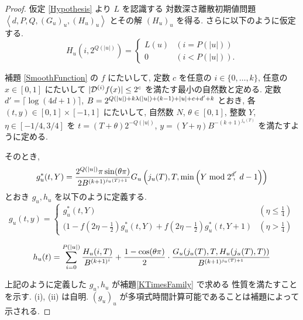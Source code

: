   \begin{proof}
  仮定 \ref{Hypothesis} より $L$ を認識する 
  対数深さ離散初期値問題 $\left< d, P, Q,(G_u)_u,(H_u)_u \right>$
  とその解 $(H_u)_u$ を得る.
  さらに以下のように仮定する.
  \begin{equation}
   H_u(i, 2^{Q(|u|)}) = \begin{cases}
			L(u) & (i=P(|u|)) \\
			0 & (i<P(|u|)).
			\end{cases}
  \end{equation}

    補題 \ref{SmoothFunction} の $f$ にたいして, 
 定数 $c$ を任意の $i \in \{0, \dots, k\}$, 任意の $x \in [0,1]$ にたいして $|\mathcal D^{(i)} f(x)| \le 2^c$ を満たす最小の自然数と定める.
 定数 $d' = \lceil \log (4d + 1) \rceil$, 
 $B = 2^{{Q(|u|)} + k {\lambda(|u|)} + (k - 1) + |u| + c + d' + k}$ とおき, 
 各 $(t, y) \in [0,1] \times [-1, 1]$ にたいして,
 自然数 $N$, $\theta \in [0,1]$, 整数 $Y$, $\eta \in [-1/4, 3/4]$ を
 $t = (T + \theta)2^{-Q(|u|)}$, $y = (Y + \eta)B^{-(k+1)^{j_u(T)}}$ 
  を満たすように定める.
 
 そのとき,
 \begin{equation}
  g^*_u(t, Y) = \frac{2^{Q(|u|)} \pi \sin (\theta\pi)}{2 B^{(k+1)^{j_u(T)+1}}}
   G_u\left( j_u(T), T, \min \left(Y \bmod 2^{d'}\!\!\!,\ d-1 \right) \right)
 \end{equation}
 とおき $g_u, h_u$ を以下のように定義する.
 \begin{equation}
  g_u(t,y) 
  = \begin{cases}
     g^*_u(t, Y)& (\eta \le \frac 1 4) \\
     ( 1-f \left( 2\eta - \frac 1 2 \right)g^*_u(t, Y) 
     + f \left( 2\eta -  \frac 1 2 \right) g^*_u(t, Y+1)
     & (\eta > \frac 1 4)
    \end{cases}
  \label{ktimes:eq:gu}
 \end{equation}

 \begin{equation} 
  h_u(t) = \sum^{{P(|u|)}}_{i=0} \frac{H_u(i, T)}{B^{(k+1)^i}}
  + \frac{1-\cos(\theta\pi)}{2} 
  \cdot \frac{G_u(j_u(T), T, H_u(j_u(T), T))}{B^{(k+1)^{j_u(T)+1}}}
  \label{ktimes:eq:hu}
 \end{equation}

 上記のように定義した $g_u, h_u$ が補題\ref{KTimesFamily} で求める
 性質を満たすことを示す. (i), (ii) は自明. 
 $(g_u)_u$ が多項式時間計算可能であることは補題によって示される.


\end{proof}
